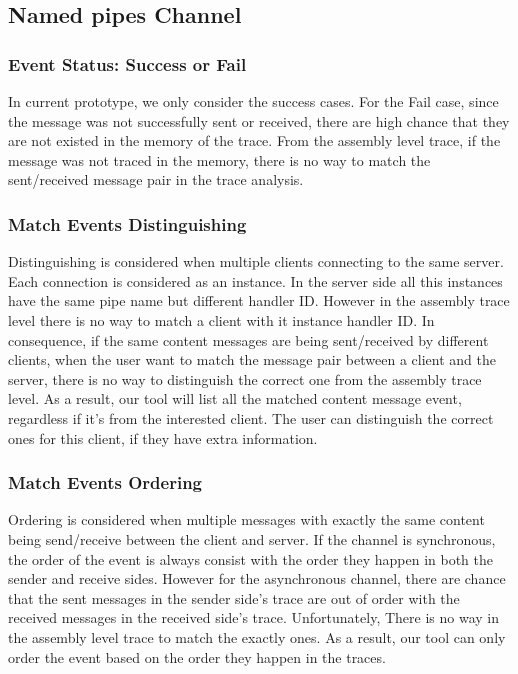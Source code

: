 \documentclass[paper=a4, fontsize=11pt]{scrartcl}
\numberwithin{equation}{section}		%
\numberwithin{figure}{section}			%
\numberwithin{table}{section}				%
\begin{document}
\subsection{Named pipes Channel}
\subsubsection{Event Status: Success or Fail}
In current prototype, we only consider the success cases. For the Fail case, since the message was not successfully sent or received, there are high chance that they are not existed in the memory of the trace. From the assembly level trace, if the message was not traced in the memory, there is no way to match the sent/received message pair in the trace analysis.   

\subsubsection{Match Events Distinguishing}
Distinguishing is considered when multiple clients connecting to the same server. Each connection is considered as an instance. In the server side all this instances have the same pipe name but different handler ID. However in the assembly trace level there is no way to match a client with it instance handler ID. In consequence, if the same content messages are being sent/received by different clients, when the user want to match the message pair between a client and the server, there is no way to distinguish the correct one from the assembly trace level. As a result, our tool will list all the matched content message event, regardless if it's from the interested client. The user can distinguish the correct ones for this client, if they have extra information.

\subsubsection{Match Events Ordering}
Ordering is considered when multiple messages with exactly the same content being send/receive between the client and server. If the channel is synchronous, the order of the event is always consist with the order they happen in both the sender and receive sides. However for the asynchronous channel, there are chance that the sent messages in the sender side's trace are out of order with the received messages in the received side's trace. Unfortunately, There is no way in the assembly level trace to match the exactly ones. As a result, our tool can only order the event based on the order they happen in the traces.
\end{document}
